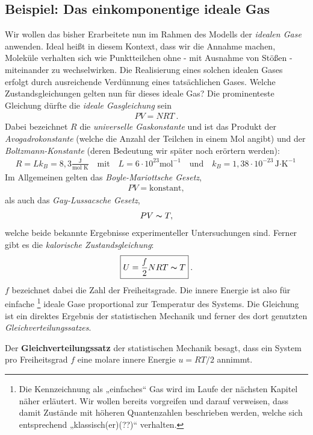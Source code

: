 \subsection{Beispiel: Das einkomponentige ideale Gas} 
Wir wollen das bisher Erarbeitete nun im Rahmen des Modells der \emph{idealen Gase} anwenden. Ideal heißt in diesem Kontext, dass wir die Annahme machen, Moleküle verhalten sich wie Punktteilchen ohne - mit Ausnahme von Stößen - miteinander zu wechselwirken. Die Realisierung eines solchen idealen Gases erfolgt durch ausreichende Verdünnung eines tatsächlichen Gases.
Welche Zustandsgleichungen gelten nun für dieses ideale Gas?
Die prominenteste Gleichung dürfte die \emph{ideale Gasgleichung} sein 
\begin{align*}
    \boxed{PV=NRT}\:.
\end{align*}
Dabei bezeichnet $R$ die \emph{universelle Gaskonstante} und ist das Produkt der \emph{Avogadrokonstante} (welche die Anzahl der Teilchen in einem Mol angibt) und der \emph{Boltzmann-Konstante} (deren Bedeutung wir später noch erörtern werden): 
\begin{align*}
    R=Lk_B=8,3\frac{\text{J}}{\text{mol K}}\quad\text{mit}\quad L=6\cdot10^{23}\text{mol}^{-1} \quad\text{und}\quad k_B=1,38\cdot10^{-23}\text{J$\cdot$K}^{-1}
\end{align*}
Im Allgemeinen gelten das \emph{Boyle-Mariottsche Gesetz},
\begin{align*}
    PV=\text{konstant},
\end{align*}
als auch das \emph{Gay-Lussacsche Gesetz}, 
\begin{align*}
    PV\thicksim T,
\end{align*}
welche beide bekannte Ergebnisse experimenteller Untersuchungen sind.
Ferner gibt es die \emph{kalorische Zustandsgleichung}: 
\begin{align*}
    \boxed{U=\frac{f}{2}NRT\thicksim T}\:.
\end{align*} 
$f$ bezeichnet dabei die Zahl der Freiheitsgrade. Die innere Energie ist also für einfache \footnote{Die Kennzeichnung als „einfaches“ Gas wird im Laufe der nächsten Kapitel näher erläutert. Wir wollen bereits vorgreifen und darauf verweisen, dass damit Zustände mit höheren Quantenzahlen beschrieben werden, welche sich entsprechend „klassisch(er)(??)“ verhalten.} ideale Gase proportional zur Temperatur des Systems. 
Die Gleichung ist ein direktes Ergebnis der statistischen Mechanik und ferner des dort genutzten \emph{Gleichverteilungssatzes}.
\begin{formal}
    Der \textbf{Gleichverteilungssatz} der statistischen Mechanik besagt, dass ein System pro Freiheitsgrad $f$ eine molare innere Energie $u=RT/2$ annimmt.
\end{formal} 
